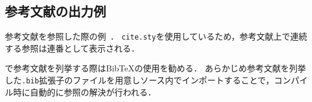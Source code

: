 \subsection{参考文献の出力例}

参考文献を参照した際の例~\cite{book:Codd2002,book:Bayer2002:1,book:Bayer2002:2}．
\texttt{cite.sty}を使用しているため，参考文献上で連続する参照は連番として表示される．

{\LaTeXe}で参考文献を列挙する際はBibTeXの使用を勧める．
あらかじめ参考文献を列挙した\texttt{.bib}拡張子のファイルを用意し{\LaTeXe}ソース内でインポートすることで，コンパイル時に自動的に参照の解決が行われる．
